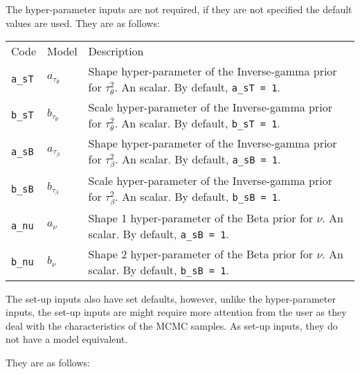 \documentclass[
]{article}
\begin{document}
The hyper-parameter inputs are not required, if they are not specified the
default values are used. They are as follows:

\begin{longtable}[]{@{}
  >{\raggedleft\arraybackslash}p{}
  >{\centering\arraybackslash}p{}
  >{\raggedright\arraybackslash}p{}@{}}
\toprule\noalign{}
\endhead
\bottomrule\noalign{}
\endlastfoot
Code & Model & Description \\
\texttt{a\_sT} & \(a_{\tau_\theta}\) & Shape hyper-parameter of the Inverse-gamma prior for
\(\tau_\theta^2\). An scalar. By default, \texttt{a\_sT\ =\ 1}. \\
\texttt{b\_sT} & \(b_{\tau_\theta}\) & Scale hyper-parameter of the Inverse-gamma prior for
\(\tau_\theta^2\). An scalar. By default, \texttt{b\_sT\ =\ 1}. \\
\texttt{a\_sB} & \(a_{\tau_\beta}\) & Shape hyper-parameter of the Inverse-gamma prior for
\(\tau_\beta^2\). An scalar. By default, \texttt{a\_sB\ =\ 1}. \\
\texttt{b\_sB} & \(b_{\tau_\beta}\) & Scale hyper-parameter of the Inverse-gamma prior for
\(\tau_\beta^2\). An scalar. By default, \texttt{b\_sB\ =\ 1}. \\
\texttt{a\_nu} & \(a_{\nu}\) & Shape 1 hyper-parameter of the Beta prior for
\(\nu\). An scalar. By default, \texttt{a\_sB\ =\ 1}. \\
\texttt{b\_nu} & \(b_{\nu}\) & Shape 2 hyper-parameter of the Beta prior for
\(\nu\). An scalar. By default, \texttt{b\_sB\ =\ 1}. \\
\end{longtable}

The set-up inputs also have set defaults, however, unlike the hyper-parameter
inputs, the set-up inputs are might require more attention from the user as
they deal with the characteristics of the MCMC samples. As set-up inputs,
they do not have a model equivalent.

They are as follows:
\end{document}
